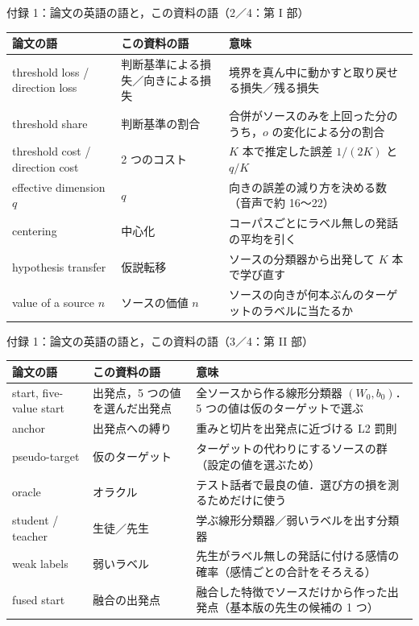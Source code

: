 \begin{frame}{付録 1：論文の英語の語と，この資料の語（2／4：第 I 部）}
  \vspace{-0.2em}
  \centering\scriptsize
  \renewcommand{\arraystretch}{1.12}
  \begin{tabularx}{\textwidth}{@{}l l X@{}}
    \toprule
    論文の語 & この資料の語 & 意味 \\
    \midrule
    threshold loss / direction loss & 判断基準による損失／向きによる損失 & 境界を真ん中に動かすと取り戻せる損失／残る損失 \\
    threshold share & 判断基準の割合 & 合併がソースのみを上回った分のうち，$o$ の変化による分の割合 \\
    threshold cost / direction cost & 2 つのコスト & $K$ 本で推定した誤差 $1/(2K)$ と $q/K$ \\
    effective dimension $q$ & $q$ & 向きの誤差の減り方を決める数（音声で約 16〜22） \\
    centering & 中心化 & コーパスごとにラベル無しの発話の平均を引く \\
    hypothesis transfer & 仮説転移 & ソースの分類器から出発して $K$ 本で学び直す \\
    value of a source $n$ & ソースの価値 $n$ & ソースの向きが何本ぶんのターゲットのラベルに当たるか \\
    \bottomrule
  \end{tabularx}
\end{frame}

\begin{frame}{付録 1：論文の英語の語と，この資料の語（3／4：第 II 部）}
  \vspace{-0.2em}
  \centering\scriptsize
  \renewcommand{\arraystretch}{1.12}
  \begin{tabularx}{\textwidth}{@{}l l X@{}}
    \toprule
    論文の語 & この資料の語 & 意味 \\
    \midrule
    start, five-value start & 出発点，5 つの値を選んだ出発点 & 全ソースから作る線形分類器 $(W_0, b_0)$．5 つの値は仮のターゲットで選ぶ \\
    anchor & 出発点への縛り & 重みと切片を出発点に近づける L2 罰則 \\
    pseudo-target & 仮のターゲット & ターゲットの代わりにするソースの群（設定の値を選ぶため） \\
    oracle & オラクル & テスト話者で最良の値．選び方の損を測るためだけに使う \\
    student / teacher & 生徒／先生 & 学ぶ線形分類器／弱いラベルを出す分類器 \\
    weak labels & 弱いラベル & 先生がラベル無しの発話に付ける感情の確率（感情ごとの合計をそろえる） \\
    fused start & 融合の出発点 & 融合した特徴でソースだけから作った出発点（基本版の先生の候補の 1 つ） \\
    \bottomrule
  \end{tabularx}
\end{frame}

